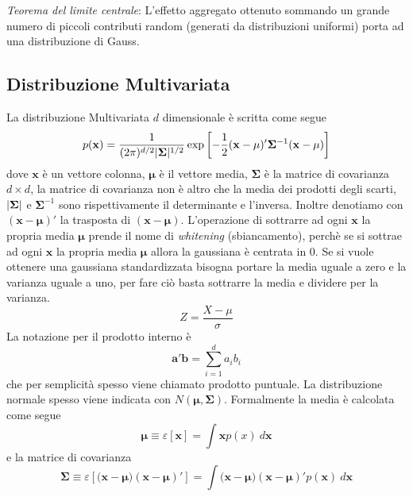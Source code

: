 \noindent \emph{Teorema del limite centrale}: L’effetto aggregato ottenuto sommando un grande numero di piccoli contributi random (generati da distribuzioni uniformi) porta ad una distribuzione di Gauss.

\subsection{Distribuzione Multivariata}
La distribuzione Multivariata $d$ dimensionale è scritta come segue
\begin{equation}\label{distribuzioneMultivariata}
p(\mathbf{x}) = \frac{1}{(2\pi)^{d/2} \lvert\mathbf{\Sigma}\rvert^{1/2}} \exp \left [ - \frac{1}{2} (\mathbf{x} - \mathbf{\mu})'  \mathbf{\Sigma}^{-1} (\mathbf{x} - \mathbf{\mu}) \right ]
\end{equation}
dove $\mathbf{x}$ è un vettore colonna, $\mathbf{\mu}$ è il vettore media, $\mathbf{\Sigma}$ è la matrice di covarianza $d \times d$, la matrice di covarianza non è altro che la media dei prodotti degli scarti, $\lvert\mathbf{\Sigma}\rvert$ e $ \mathbf{\Sigma}^{-1}$ sono rispettivamente il determinante e l'inversa. Inoltre denotiamo con $(\mathbf{x} - \mathbf{\mu})' $ la trasposta di $(\mathbf{x} - \mathbf{\mu})$. L'operazione di sottrarre ad ogni $\mathbf{x}$ la propria media $\mathbf{\mu}$ prende il nome di \emph{whitening} (sbiancamento), perchè se si sottrae ad ogni $\mathbf{x}$ la propria media $\mathbf{\mu}$ allora la gaussiana è centrata in 0. Se si vuole ottenere una gaussiana standardizzata bisogna portare la media uguale a zero e la varianza uguale a uno, per fare ciò basta sottrarre la media e dividere per la varianza.
\begin{equation}
Z = \frac{X-\mu}{\sigma}
\end{equation}
La notazione per il prodotto interno è
\begin{equation}
\mathbf{a'b} = \sum_{i=1}^d a_ib_i
\end{equation}
che per semplicità spesso viene chiamato prodotto puntuale. La distribuzione normale spesso viene indicata con $N(\mathbf{\mu, \Sigma})$.
Formalmente la media è calcolata come segue
\begin{equation}
\mathbf{\mu} \equiv \varepsilon[\mathbf{x}] = \int \mathbf{x} p(x) \  d \mathbf{x}
\end{equation}
e la matrice di covarianza 
\begin{equation}
\mathbf{\Sigma} \equiv \varepsilon[(\mathbf{x-\mu)(x-\mu)'}] = \int (\mathbf{x-\mu)(x-\mu)'} p(\mathbf{x})  \  d \mathbf{x}
\end{equation} 
